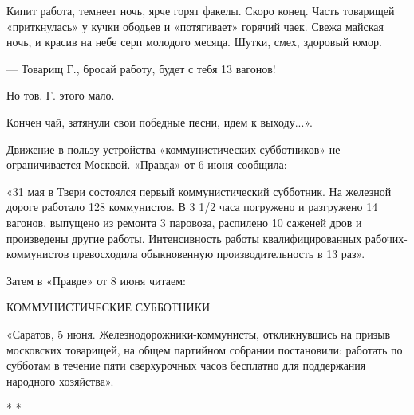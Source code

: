 \documentclass[12pt]{article}
\newcommand{\parnum}{(\arabic{parcount})}
\newcounter{parcount}
\newenvironment{parnumbers}{%
  \par%
  \everypar{\noindent \stepcounter{parcount}\marginpar[]{\parnum}}%
}{}
\begin{document}
\begin{parnumbers}
Кипит работа, темнеет ночь, ярче горят факелы. Скоро конец. Часть товарищей «приткнулась» у кучки ободьев и «потягивает» горячий чаек. Свежа майская ночь, и красив на небе серп молодого месяца. Шутки, смех, здоровый юмор.

— Товарищ Г., бросай работу, будет с тебя 13 вагонов!

Но тов. Г. этого мало.

Кончен чай, затянули свои победные песни, идем к выходу...».

Движение в пользу устройства «коммунистических субботников» не ограничивается Москвой. «Правда» от 6 июня сообщила:

«31 мая в Твери состоялся первый коммунистический субботник. На железной дороге работало 128 коммунистов. В 3 1/2 часа погружено и разгружено 14 вагонов, выпущено из ремонта 3 паровоза, распилено 10 саженей дров и произведены другие работы. Интенсивность работы квалифицированных рабочих-коммунистов превосходила обыкновенную производительность в 13 раз».

Затем в «Правде» от 8 июня читаем:

КОММУНИСТИЧЕСКИЕ СУББОТНИКИ

«Саратов, 5 июня. Железнодорожники-коммунисты, откликнувшись на призыв московских товарищей, на общем партийном собрании постановили: работать по субботам в течение пяти сверхурочных часов бесплатно для поддержания народного хозяйства».
\end{parnumbers}

\centering * * *
\end{document}
